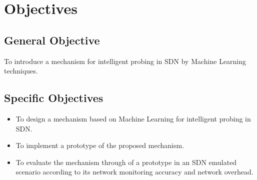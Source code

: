 \section{Objectives}
\label{sec:objectives}

\subsection{General Objective}

To introduce a mechanism for intelligent probing in SDN by Machine Learning techniques.

\subsection{Specific Objectives}

\begin{itemize}
    \item To design a mechanism based on Machine Learning for intelligent probing in SDN.
    \item To implement a prototype of the proposed mechanism.
    \item To evaluate the mechanism through of a prototype in an SDN emulated scenario according to its network monitoring accuracy and network overhead.
\end{itemize}